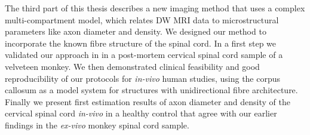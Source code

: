The third part of this thesis describes a new imaging method that uses a complex multi-compartment model, which relates DW MRI data to microstructural parameters like axon diameter and density. We designed our method to incorporate the known fibre structure of the spinal cord. In a first step we validated our approach in in a post-mortem cervical spinal cord sample of a velveteen monkey. We then demonstrated clinical feasibility and good reproducibility of our protocols for \emph{in-vivo} human studies, using the corpus callosum as a model system for structures with unidirectional fibre architecture. Finally we present first estimation results of axon diameter and density of the cervical spinal cord \emph{in-vivo} in a healthy control that agree with our earlier findings in the \emph{ex-vivo} monkey spinal cord sample.

\endgroup			

\vfill